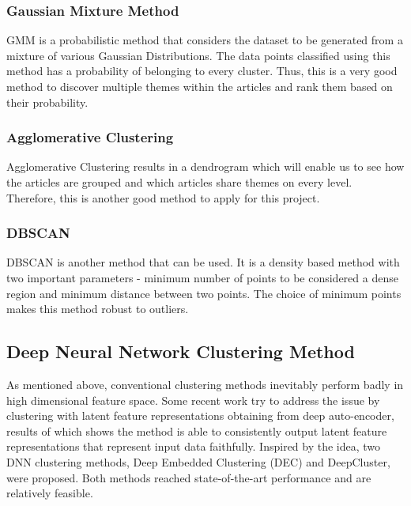 \documentclass[12pt]{article}
\begin{document}
\subsubsection{Gaussian Mixture Method}
GMM is a probabilistic method that considers the dataset to be generated from a mixture of various Gaussian Distributions. The data points classified using this method has a probability of belonging to every cluster. Thus, this is a very good method to discover multiple themes within the articles and rank them based on their probability. \\
\subsubsection{Agglomerative Clustering}
Agglomerative Clustering results in a dendrogram which will enable us to see how the articles are grouped and which articles share themes on every level. Therefore, this is another good method to apply for this project.\\
\subsubsection{DBSCAN}
DBSCAN is another method that can be used. It is a density based method with two important parameters - minimum number of points to be considered a dense region and minimum distance between two points. The choice of minimum points makes this method robust to outliers.\\

\subsection{Deep Neural Network Clustering Method}
As mentioned above, conventional clustering methods inevitably perform badly in high dimensional feature space. Some recent work try to address the issue by clustering with latent feature representations obtaining from deep auto-encoder, results of which shows the method is able to consistently output latent feature representations that  represent input data faithfully\cite{le2013building}\cite{vincent2010stacked}. Inspired by the idea, two DNN clustering methods, Deep Embedded Clustering (DEC) and DeepCluster, were proposed\cite{tian2017deepcluster}\cite{xie2016unsupervised}. Both methods reached state-of-the-art performance and are relatively feasible. 
\end{document}
